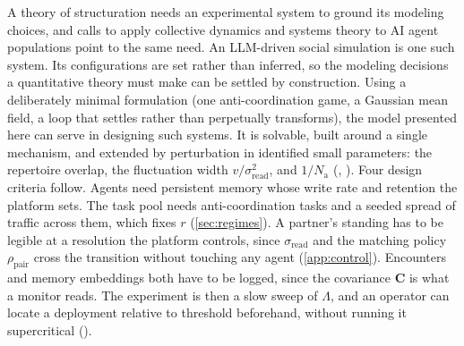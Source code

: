 \documentclass[
  aps,prx,
  reprint,
  superscriptaddress,
  nofootinbib,
  longbibliography
]{revtex4-2}
\newcommand{\C}{\mathbf{C}}
\newcommand{\rhopair}{\rho_{\mathrm{pair}}}
\newcommand{\sread}{\sigma_{\mathrm{read}}}
\newcommand{\Nag}{N_{\mathrm{a}}}
\newcommand{\smref}[1]{\cite[Sec.~#1]{SM}}
\begin{document}
A theory of structuration needs an experimental system to ground its modeling choices, and calls to apply collective dynamics \cite{han2026} and systems theory \cite{miehling2025} to AI agent populations point to the same need. An LLM-driven social simulation \cite{vezhnevets2023} is one such system. Its configurations are set rather than inferred, so the modeling decisions a quantitative theory must make can be settled by construction. Using a deliberately minimal formulation (one anti-coordination game, a Gaussian mean field, a loop that settles rather than perpetually transforms), the model presented here can serve in designing such systems. It is solvable, built around a single mechanism, and extended by perturbation in identified small parameters: the repertoire overlap, the fluctuation width $v/\sread^2$, and $1/\Nag$ (\smref{S6}, \smref{S7}). Four design criteria follow. Agents need persistent memory whose write rate and retention the platform sets. The task pool needs anti-coordination tasks and a seeded spread of traffic across them, which fixes $r$ (\cref{sec:regimes}). A partner's standing has to be legible at a resolution the platform controls, since $\sread$ and the matching policy $\rhopair$ cross the transition without touching any agent (\cref{app:control}). Encounters and memory embeddings both have to be logged, since the covariance $\C$ is what a monitor reads. The experiment is then a slow sweep of $\Lambda$, and an operator can locate a deployment relative to threshold beforehand, without running it supercritical (\smref{S2\,C}).
\end{document}
